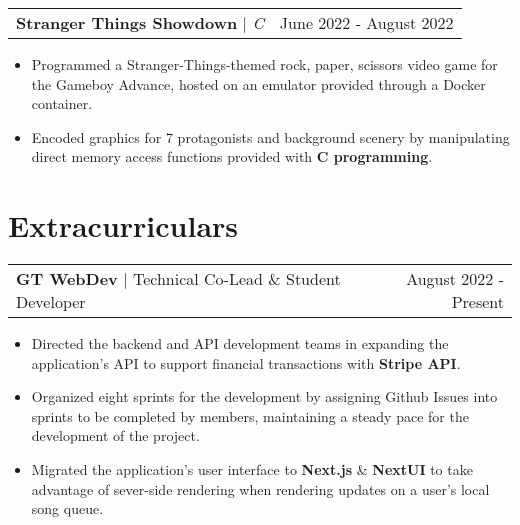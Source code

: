 \documentclass[letterpaper,11pt]{article}
\makeatletter
\newcommand{\resumeExperienceHeading}[3]{
    \begin{tabular*}{0.99\textwidth}[t]{l@{\extracolsep{\fill}}r}
      \textbf{#1} $\vert$ {#2} & {#3} \\
    \end{tabular*}\vspace{-3pt}
}
\newcommand{\resumeProjectHeading}[3]{
    \begin{tabular*}{0.97\textwidth}[t]{l@{\extracolsep{\fill}}r}
      \textbf{#1} $\vert$ \textit{#2}  & {#3}
    \end{tabular*}\vspace{-3pt}
}
\newcommand{\resumeItemListStart}{\begin{itemize}[noitemsep]\vspace{-4pt}}
\newcommand{\resumeItemListEnd}{\end{itemize}}
\makeatother
\begin{document}
    \resumeProjectHeading{Stranger Things Showdown}{C}{June 2022 - August 2022}
      \resumeItemListStart
        \item {Programmed a Stranger-Things-themed rock, paper, scissors video game for the Gameboy Advance, hosted on an emulator provided through a Docker container.}
        \item {Encoded graphics for 7 protagonists and background scenery by manipulating direct memory access functions provided with \textbf{C programming}.}
      \resumeItemListEnd

\section{Extracurriculars}
  \resumeExperienceHeading{GT WebDev}{Technical Co-Lead \& Student Developer}{August 2022 - Present}
    \resumeItemListStart
      \item {Directed the backend and API development teams in expanding the application's API to support financial transactions with \textbf{Stripe API}.}
      \item {Organized eight sprints for the development by assigning Github Issues into sprints to be completed by members, maintaining a steady pace for the development of the project.}
      \item {Migrated the application's user interface to \textbf{Next.js} \& \textbf{NextUI} to take advantage of sever-side rendering when rendering updates on a user's local song queue.}
    \resumeItemListEnd
  
\end{document}
